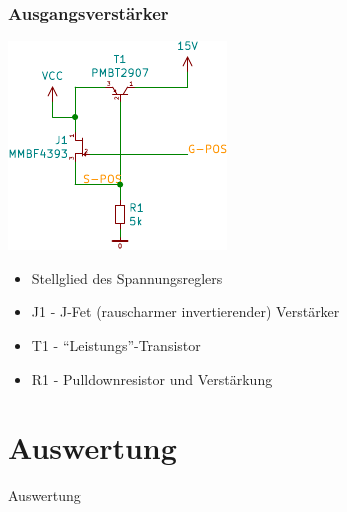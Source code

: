 \documentclass[aspectratio=32]{beamer}
\begin{document}
\begin{frame}
  \frametitle{Ausgangsverstärker}
  \centering
  \includegraphics[height=0.4\textheight]{../common/Simulation/out.pdf}
  \begin{itemize}
    \item Stellglied des Spannungsreglers
    \item J1 - J-Fet (rauscharmer invertierender) Verstärker
    \item T1 - ``Leistungs''-Transistor
    \item R1 - Pulldownresistor und Verstärkung
  \end{itemize}
\end{frame}

\section{Auswertung}
{
  \logo{}
  \begin{frame}
    \centering
    \Large{Auswertung}
  \end{frame}
}
\end{document}
